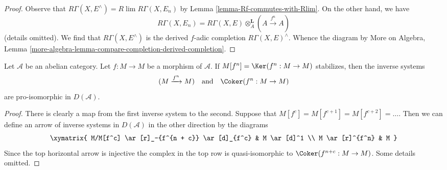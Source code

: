 \begin{proof}
Observe that $R\Gamma(X, E^\wedge) = R\lim R\Gamma(X, E_n)$ by
Lemma \ref{lemma-Rf-commutes-with-Rlim}.
On the other hand, we have
$$
R\Gamma(X, E_n) =
R\Gamma(X, E) \otimes_A^\mathbf{L} (A \xrightarrow{f^n} A)
$$
(details omitted). We find that $R\Gamma(X, E^\wedge)$ is the derived
$f$-adic completion $R\Gamma(X, E)^\wedge$. Whence the diagram by
More on Algebra, Lemma
\ref{more-algebra-lemma-compare-completion-derived-completion}.
\end{proof}

\begin{lemma}
\label{lemma-stabilizes}
Let $\mathcal{A}$ be an abelian category. Let $f : M \to M$ be a morphism
of $\mathcal{A}$. If $M[f^n] = \Ker(f^n : M \to M)$ stabilizes, then the
inverse systems
$$
(M \xrightarrow{f^n} M)
\quad\text{and}\quad
\Coker(f^n : M \to M)
$$
are pro-isomorphic in $D(\mathcal{A})$.
\end{lemma}

\begin{proof}
There is clearly a map from the first inverse system to the second. Suppose that
$M[f^c] = M[f^{c + 1}] = M[f^{c + 2}] = \ldots$.
Then we can define an arrow of inverse systems in $D(\mathcal{A})$
in the other direction by the diagrams
$$
\xymatrix{
M/M[f^c] \ar[r]_-{f^{n + c}} \ar[d]_{f^c} &
M \ar[d]^1 \\
M \ar[r]^{f^n} & M
}
$$
Since the top horizontal arrow is injective the complex
in the top row is quasi-isomorphic to $\Coker(f^{n + c} : M \to M)$.
Some details omitted.
\end{proof}


